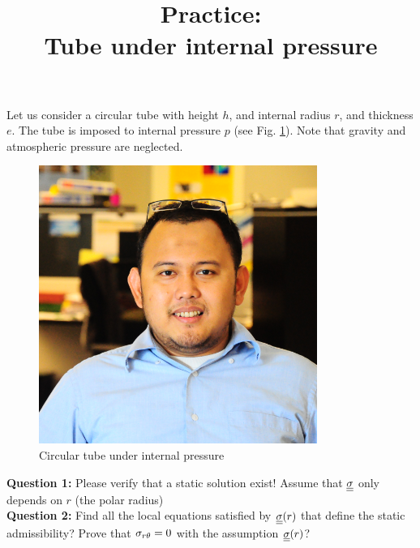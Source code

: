 \documentclass[letter,12pt]{article}
\begin{document}
\pagestyle{fancy}

\title{\textbf{Practice: \\ Tube under internal pressure}}
\date{}

\maketitle

\vspace{-1cm}


Let us consider a circular tube with height $h$, and internal radius $r$, and thickness $e$. The tube is imposed to internal pressure $p$ (see Fig. \ref{fig:replacewithrealfigure}). Note that gravity and atmospheric pressure are neglected.

\begin{figure}[ht]
	\centering
	\includegraphics[width=0.5\linewidth]{figures/replacewithrealfigure}
	\caption{Circular tube under internal pressure}
	\label{fig:replacewithrealfigure}
\end{figure}



\noindent \textbf{Question 1:} Please verify that a static solution exist! Assume that $\underline{\underline{\sigma}}$ only depends on $r$ (the polar radius)\\

\noindent \textbf{Question 2:} Find all the local equations satisfied by $\underline{\underline{\sigma}}(r)$ that define the static admissibility? Prove that $\sigma_{r\theta} = 0$ with the assumption $\underline{\underline{\sigma}}(r)$?
\end{document}
